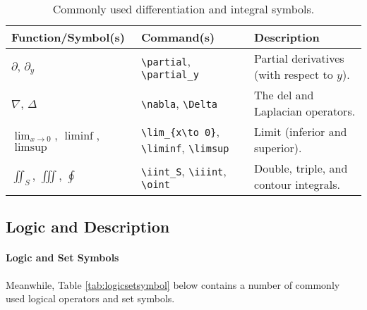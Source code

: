 \begin{table}[ht!]
\begin{tabularx}{\textwidth}{|p{}|>{\raggedright}p{}|X|}
\hline
Function/Symbol(s) & Command(s) & Description \\
\hline
$\partial$, $\partial_y$ & \texttt{\textbackslash partial}, \texttt{\textbackslash partial\_y} & Partial derivatives (with respect to $y$). \\
\hline
$\nabla$, $\Delta$ & \texttt{\textbackslash nabla}, \texttt{\textbackslash Delta} & The del and Laplacian operators. \\
\hline
$\lim_{x\to 0}$, $\liminf$, $\limsup$ & \texttt{\textbackslash lim\_\{x\textbackslash to 0\}}, \texttt{\textbackslash liminf}, \texttt{\textbackslash limsup} & Limit (inferior and superior). \\
\hline
$\iint_S$, $\iiint$, $\oint$ & \texttt{\textbackslash iint\_S}, \texttt{\textbackslash iiint}, \texttt{\textbackslash oint} & Double, triple\footnotemark, and contour integrals. \\
\hline
\end{tabularx}
\caption{Commonly used differentiation and integral symbols.}
\label{tab:deintsymbol}
\end{table}

\subsection{Logic and Description}

\paragraph{Logic and Set Symbols}
Meanwhile, Table \ref{tab:logicsetsymbol} below contains a number of commonly used logical operators and set symbols.

